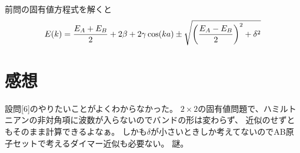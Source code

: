 \documentclass[../ap_2012.tex]{subfiles}
\begin{document}
\section{}
前問の固有値方程式を解くと
\begin{equation}\begin{aligned}[b]
    E(k) = \frac{E_A+E_B}{2}+2\beta+2\gamma\cos(ka)\pm\sqrt{\qty(\frac{E_A-E_B}{2})^2+\delta^2}
\end{aligned}\end{equation}

\section*{感想}
設問[6]のやりたいことがよくわからなかった。
\(2\times2 \)の固有値問題で、ハミルトニアンの非対角項に波数が入らないのでバンドの形は変わらず、
近似のせずともそのまま計算できるよなぁ。
しかも\(\delta\)が小さいときしか考えてないのでAB原子セットで考えるダイマー近似も必要ない。
謎。
\end{document}
